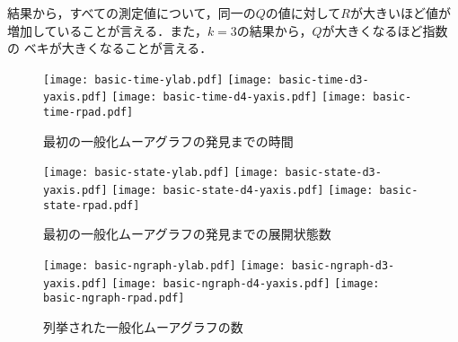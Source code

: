 結果から，すべての測定値について，同一の$Q$の値に対して$R$が大きいほど値が
増加していることが言える．また，$k=3$の結果から，$Q$が大きくなるほど指数の
ベキが大きくなることが言える．

\begin{figure}
  \centering
  \texttt{[image: basic-time-ylab.pdf]}
  \texttt{[image: basic-time-d3-yaxis.pdf]}\hspace{-3mm}
  \hspace{5mm}
  \texttt{[image: basic-time-d4-yaxis.pdf]}\hspace{-3mm}
  \texttt{[image: basic-time-rpad.pdf]}
  \caption{最初の一般化ムーアグラフの発見までの時間}
  \label{fig:basic-time}
\end{figure}

\begin{figure}
  \centering
  \texttt{[image: basic-state-ylab.pdf]}
  \texttt{[image: basic-state-d3-yaxis.pdf]}\hspace{-3mm}
  \hspace{5mm}
  \texttt{[image: basic-state-d4-yaxis.pdf]}\hspace{-3mm}
  \texttt{[image: basic-state-rpad.pdf]}
  \caption{最初の一般化ムーアグラフの発見までの展開状態数}
  \label{fig:basic-state}
\end{figure}

\begin{figure}
  \centering
  \texttt{[image: basic-ngraph-ylab.pdf]}
  \texttt{[image: basic-ngraph-d3-yaxis.pdf]}\hspace{-3mm}
  \hspace{5mm}
  \texttt{[image: basic-ngraph-d4-yaxis.pdf]}\hspace{-3mm}
  \texttt{[image: basic-ngraph-rpad.pdf]}
  \caption{列挙された一般化ムーアグラフの数}
  \label{fig:basic-ngraph}
\end{figure}
